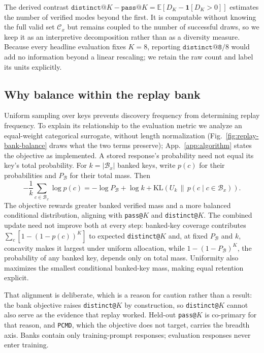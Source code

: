 \documentclass{article}
\newcommand{\1}{\mathbf 1}
\newcommand{\E}{\mathbb E}
\newcommand{\pmd}{\texttt{PCMD}}
\theoremstyle{remark}
\theoremstyle{definition}
\theoremstyle{plain}
\begin{document}
The derived contrast $\texttt{distinct@}K-\texttt{pass@}K=\E[D_K-\1[D_K>0]]$
estimates the number of verified modes beyond the first. It is computable
without knowing the full valid set $\mathcal C_x$ but remains coupled to the
number of successful draws, so we keep it as an interpretive decomposition
rather than as a diversity measure. Because every
headline evaluation fixes $K=8$, reporting $\texttt{distinct@8}/8$ would add no
information beyond a linear rescaling; we retain the raw count and label its
units explicitly.



\subsection{Why balance within the replay bank}
\label{app:replay-metric-alignment}

Uniform sampling over keys prevents discovery frequency from determining replay
frequency. To explain its relationship to the evaluation metric we analyze an
equal-weight categorical surrogate, without length normalization
(Fig.~\ref{fig:replay-bank-balance} draws what the two terms preserve);
App.~\ref{app:algorithm} states the objective as implemented.
A stored response's probability need not equal its key's total probability.
For $k=|\mathcal B_x|$ banked keys, write $p(c)$ for their probabilities and
$P_{\mathcal B}$ for their total mass. Then
\begin{equation}
 -\frac1k\sum_{c\in\mathcal B_x}\log p(c)
 =-\log P_{\mathcal B}+\log k+
   \mathrm{KL}\!\left(U_k\,\|\,
   p(c\mid c\in\mathcal B_x)\right).
 \label{eq:replay-bank-decomposition}
\end{equation}
The objective rewards greater banked verified mass and a more balanced
conditional distribution, aligning with \texttt{pass@}$K$ and
\texttt{distinct@}$K$. The combined update need not improve both at every step:
banked-key coverage contributes $\sum_c[1-(1-p(c))^K]$ to expected
\texttt{distinct@}$K$ and, at fixed $P_{\mathcal B}$ and $k$, concavity makes it
largest under uniform allocation, while $1-(1-P_{\mathcal B})^K$, the
probability of any banked key, depends only on total mass. Uniformity also
maximizes the smallest conditional banked-key mass, making equal retention
explicit.

That alignment is deliberate, which is a reason for caution rather than a
result: the bank objective raises \texttt{distinct@}$K$ by construction, so
\texttt{distinct@}$K$ cannot also serve as the evidence that replay worked.
Held-out \texttt{pass@}$K$ is co-primary for that reason, and \pmd{}, which the
objective does not target, carries the breadth axis. Banks contain only
training-prompt responses; evaluation responses never enter training.
\end{document}
